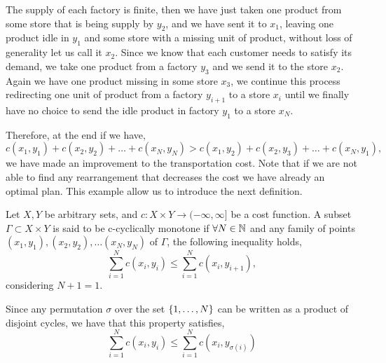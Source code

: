 The supply of each factory is finite, then we have just taken one product from some store that is being supply by $y_2$, and we have sent it to $x_1$, leaving one product idle in $y_1$ and some store with a missing unit of product, without loss of generality let us call it $x_2$. Since we know that each customer needs to satisfy its demand, we take one product from a factory $y_3$ and we send it to the store $x_2$. Again we have one product missing in some store $x_3$, we continue this process redirecting one unit of product from a factory $y_{i+1}$ to a store $x_{i}$ until we finally have no choice to send the idle product in factory $y_1$ to a store $x_N$. 

Therefore, at the end if we have, 
\begin{equation*}
	c(x_1, y_1)+c(x_2, y_2)+\dots+c(x_N, y_N)> c(x_1, y_2)+c(x_2,y_3)+\dots+c(x_N, y_1), 
\end{equation*}
we have made an improvement to the transportation cost.  Note that if we are not able to find any rearrangement that decreases the cost we have already an optimal plan. This example allow us to introduce the next definition.
\begin{definition}
	Let $X , Y$ be arbitrary sets, and $c:X\times Y \rightarrow (-\infty, \infty]$ be a cost function. A subset $\Gamma \subset X \times Y$ is said to be c-cyclically monotone if $\forall N\in\mathbb{N}$ and any family of points $(x_1, y_1), (x_2, y_2), \dots (x_N, y_N)$ of $\Gamma$, the following inequality holds,
	\begin{equation*}
	\sum_{i=1}^{N} c(x_i, y_i) \leq \sum_{i=1}^{N} c(x_i, y_{i+1}),
	\end{equation*} 
	considering $N+1=1$. 
\end{definition}
Since any permutation $\sigma$ over the set $\left\lbrace 1, \dots, N \right\rbrace$ can be written as a product of disjoint cycles, we have that this property satisfies,
\begin{equation}
\sum_{i=1}^{N} c(x_i, y_i) \leq \sum_{i=1}^{N} c(x_i, y_{\sigma(i)}) 
\end{equation}


